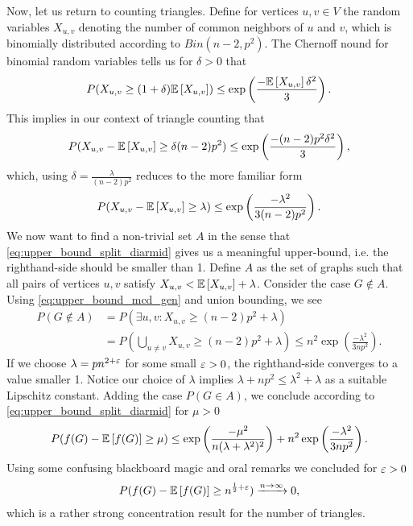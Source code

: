 Now, let us return to counting triangles.
Define for vertices $u,v \in V$ the random variables $X_{u,v}$ denoting the number of
common neighbors of $u$ and $v$, which is binomially distributed according to $Bin(n-2,p^2)$.
The Chernoff nound for binomial random variables tells us for $\delta > 0 $ that
\begin{align*}
    P(X_{u,v} \geq (1+ \delta)\mathbb{E}\left[X_{u,v}\right]) \leq \exp\left(\frac{-\mathbb{E}\left[X_{u,v}\right]\delta^2}{3}\right).
\end{align*}
This implies in our context of triangle counting that
\begin{align*}
    P(X_{u,v} - \mathbb{E}\left[X_{u,v}\right] \geq \delta (n-2)p^2) \leq \exp\left(\frac{-(n-2)p^2\delta^2}{3}\right),
\end{align*}
which, using $\delta = \frac{\lambda}{(n-2)p^2}$ reduces to the more familiar form
\begin{align}\label{eq:upper_bound_mcd_gen}
    P(X_{u,v} - \mathbb{E}\left[X_{u,v}\right] \geq \lambda) \leq \exp\left(\frac{-\lambda^2}{3(n-2)p^2}\right).
\end{align}
We now want to find a non-trivial set $A$ in the sense that \eqref{eq:upper_bound_split_diarmid}
gives us a meaningful upper-bound, i.e. the righthand-side should be smaller than 1.
Define $A$ as the set of graphs such that all pairs of vertices $u,v$ satisfy $X_{u,v} < \mathbb{E}\left[X_{u,v}\right] + \lambda$.
Consider the case $G \not \in A$. Using \eqref{eq:upper_bound_mcd_gen} and union bounding, we see
\begin{align*}
    P(G \not \in A) & = P(\exists u,v: X_{u,v} \geq (n-2)p^2+\lambda)                                                                          \\
                    & = P\left(\bigcup_{u \neq v} X_{u,v} \geq (n-2)p^2 + \lambda \right) \leq n^2 \exp \left(\frac{-\lambda^2}{3np^2}\right).
\end{align*}
If we choose $\lambda = pn^{2+\varepsilon}$ for some small $\varepsilon > 0$, the righthand-side
converges to a value smaller 1.
Notice our choice of $\lambda$ implies $\lambda + np^2 \leq \lambda^2 + \lambda$ as a suitable Lipschitz constant.
Adding the case $P(G \in A)$, we conclude according to \eqref{eq:upper_bound_split_diarmid} for $\mu > 0$
\begin{align*}
    P(f(G) - \mathbb{E}\left[f(G)\right] \geq \mu) \leq \exp\left(\frac{-\mu^2}{n(\lambda+\lambda^2)^2}\right) +  n^2\exp\left(\frac{-\lambda^2}{3np^2}\right).
\end{align*}
Using some confusing blackboard magic and oral remarks we concluded for $\varepsilon > 0$
\begin{align}
    P(f(G) - \mathbb{E}\left[f(G)\right] \geq n^{\frac{1}{2}+\varepsilon}) \xrightarrow{n \rightarrow \infty} 0,
\end{align}
which is a rather strong concentration result for the number of triangles.

